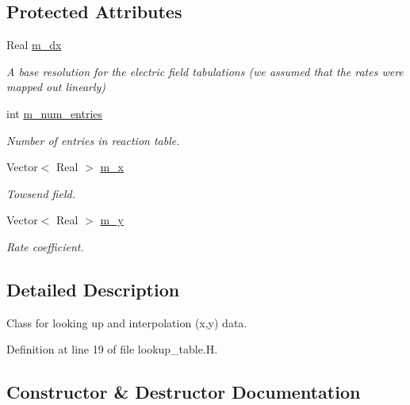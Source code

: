 \subsection*{Protected Attributes}
\begin{DoxyCompactItemize}
\item 
Real \hyperlink{classlookup__table_ae68ee05a54e9b1cf8de864b2d3a6025d}{m\+\_\+dx}
\begin{DoxyCompactList}\small\item\em A base resolution for the electric field tabulations (we assumed that the rates were mapped out linearly) \end{DoxyCompactList}\item 
int \hyperlink{classlookup__table_ae28e516154c30a620b820381c75408e5}{m\+\_\+num\+\_\+entries}
\begin{DoxyCompactList}\small\item\em Number of entries in reaction table. \end{DoxyCompactList}\item 
Vector$<$ Real $>$ \hyperlink{classlookup__table_a34979719a0df9629e975a2f3cb77ee41}{m\+\_\+x}
\begin{DoxyCompactList}\small\item\em Towsend field. \end{DoxyCompactList}\item 
Vector$<$ Real $>$ \hyperlink{classlookup__table_a06214a7af654ac56bf94d51d685c961f}{m\+\_\+y}
\begin{DoxyCompactList}\small\item\em Rate coefficient. \end{DoxyCompactList}\end{DoxyCompactItemize}


\subsection{Detailed Description}
Class for looking up and interpolation (x,y) data. 

Definition at line 19 of file lookup\+\_\+table.\+H.



\subsection{Constructor \& Destructor Documentation}
